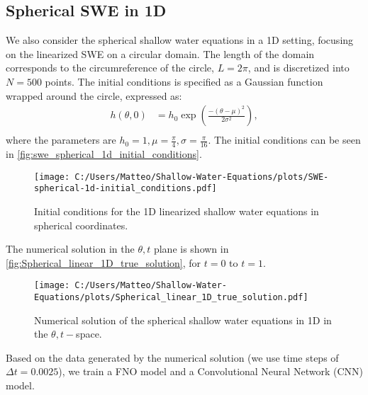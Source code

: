 \subsection{Spherical SWE in 1D}
We also consider the spherical shallow water equations in a 1D setting, focusing on the linearized SWE on a circular domain.
The length of the domain corresponds to the circumreference of the circle, $L = 2\pi$, and is discretized into $N = 500$ points.
The initial conditions is specified as a Gaussian function wrapped around the circle, expressed as:
\begin{align*}
    h(\theta, 0) &= h_0 \exp \left( \frac{-{(\theta-\mu)}^2}{2 \sigma^2} \right) ,\\
\end{align*}
where the parameters are $h_0 = 1, \mu = \frac{\pi}{4}, \sigma = \frac{\pi}{16}$.
The initial conditions can be seen in \autoref{fig:swe_spherical_1d_initial_conditions}.
\begin{figure}[H]
    \centering
    \texttt{[image: C:/Users/Matteo/Shallow-Water-Equations/plots/SWE-spherical-1d-initial\_conditions.pdf]}
    \caption{Initial conditions for the 1D linearized shallow water equations in spherical coordinates.}\label{fig:swe_spherical_1d_initial_conditions}
\end{figure}
The numerical solution in the $\theta,t$ plane is shown in \autoref{fig:Spherical_linear_1D_true_solution}, for $t=0$ to $t=1$.
\begin{figure}[H]
    \centering
    \texttt{[image: C:/Users/Matteo/Shallow-Water-Equations/plots/Spherical\_linear\_1D\_true\_solution.pdf]}
    \caption{Numerical solution of the spherical shallow water equations in 1D in the $\theta,t-$space.}\label{fig:Spherical_linear_1D_true_solution}
\end{figure}
Based on the data generated by the numerical solution (we use time steps of $\Delta t = 0.0025$), we train a FNO model and a Convolutional Neural Network (CNN) model.

